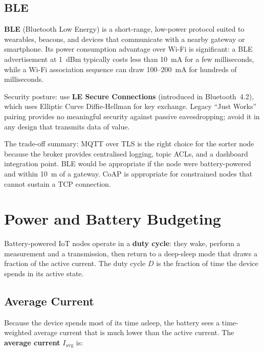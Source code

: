 \subsection{BLE}
\label{sec:ch9-protocol-ble}

\textbf{BLE} (Bluetooth Low Energy) is a short-range, low-power
protocol suited to wearables, beacons, and devices that communicate with a
nearby gateway or smartphone.
Its power consumption advantage over Wi-Fi is significant: a BLE advertisement
at 1~dBm typically costs less than 10~mA for a few milliseconds, while a Wi-Fi
association sequence can draw 100--200~mA for hundreds of milliseconds.

Security posture: use \textbf{LE Secure Connections}
(introduced in Bluetooth~4.2), which uses Elliptic Curve Diffie-Hellman for key
exchange.
Legacy ``Just Works'' pairing provides no meaningful security against passive
eavesdropping; avoid it in any design that transmits data of value.

The trade-off summary: MQTT over TLS is the right choice for the sorter node
because the broker provides centralised logging, topic ACLs, and a dashboard
integration point.
BLE would be appropriate if the node were battery-powered and within 10~m of a
gateway.
CoAP is appropriate for constrained nodes that cannot sustain a TCP connection.

\section{Power and Battery Budgeting}
\label{sec:ch9-power}

Battery-powered IoT nodes operate in a \textbf{duty cycle}:
they wake, perform a measurement and a transmission, then return to a deep-sleep
mode that draws a fraction of the active current.
The duty cycle $D$ is the fraction of time the device spends in its active state.

\subsection{Average Current}
\label{sec:ch9-power-iavg}

Because the device spends most of its time asleep, the battery sees a time-weighted
average current that is much lower than the active current.
The \textbf{average current} $I_{\text{avg}}$ is:

